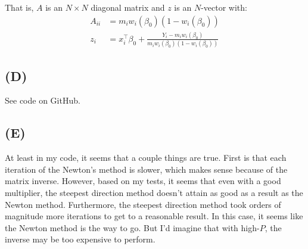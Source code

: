 \documentclass{article}
\begin{document}
That is, $A$ is an $N\times N$ diagonal matrix and $z$ is an $N$-vector with:
\begin{align*}
A_{ii}&=m_i w_i(\beta_0) (1-w_i(\beta_0))\\
z_i&=x_i^\top\beta_0+\frac{Y_i-m_i w_i(\beta_0)}{m_i w_i(\beta_0) (1-w_i(\beta_0))}
\end{align*}


\subsection{(D)}
See code on GitHub.

\subsection{(E)}
At least in my code, it seems that a couple things are true. First is that each iteration of the Newton's method is slower,
which makes sense because of the matrix inverse. However, based on my tests, it seems that even with a good multiplier, the steepest direction method doesn't attain as good as a result as the Newton method. Furthermore, the
steepest direction method took orders of magnitude more iterations to get to a reasonable result. In this case, it seems
like the Newton method is the way to go. But I'd imagine that with high-$P$, the inverse may be too expensive to perform.
\end{document}
